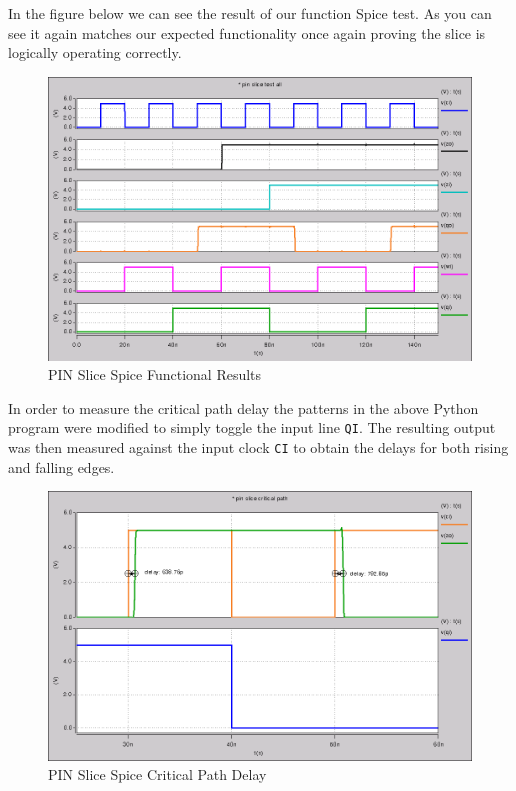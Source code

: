         

        In the figure below we can see the result of our function Spice test.
        As you can see it again matches our expected functionality once again
        proving the slice is logically operating correctly.

        \begin{figure}[H]
            \centering
            \includegraphics[width=0.65\linewidth]{../../spice/pin_slice_all.png}
            \caption{PIN Slice Spice Functional Results}
        \end{figure}

        \newpage

        In order to measure the critical path delay the patterns in the above
        Python program were modified to simply toggle the input line
        \texttt{QI}. The resulting output was then measured against the input
        clock \texttt{CI} to obtain the delays for both rising and falling
        edges.

        \begin{figure}[H]
            \centering
            \includegraphics[width=0.75\linewidth]{../../spice/pin_slice_crit_path.png}
            \caption{PIN Slice Spice Critical Path Delay}
        \end{figure}

